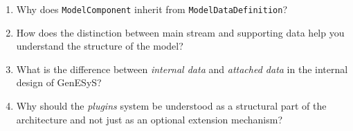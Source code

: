\begin{enumerate}
 \item Why does \texttt{ModelComponent} inherit from \texttt{ModelDataDefinition}?

\item How does the distinction between main stream and supporting data help you understand the structure of the model?

\item What is the difference between \textit{internal data} and \textit{attached data} in the internal design of GenESyS?

\item Why should the \textit{plugins} system be understood as a structural part of the architecture and not just as an optional extension mechanism?
\end{enumerate}
